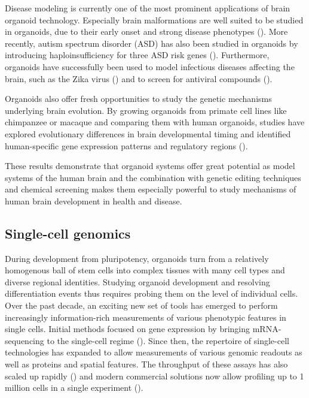 Disease modeling is currently one of the most prominent applications of brain organoid technology. Especially brain malformations are well suited to be studied in organoids, due to their early onset and strong disease phenotypes (\cite{klaus_altered_2019,lancaster_cerebral_2013}). More recently, autism spectrum disorder (ASD) has also been studied in organoids by introducing haploinsufficiency for three ASD risk genes (\cite{paulsen_autism_2022}). Furthermore, organoids have successfully been used to model infectious diseases affecting the brain, such as the Zika virus (\cite{qian_brain-region-specific_2016,dang_zika_2016}) and to screen for antiviral compounds (\cite{zhou_high-content_2017}). 

Organoids also offer fresh opportunities to study the genetic mechanisms underlying brain evolution. By growing organoids from primate cell lines like chimpanzee or macaque and comparing them with human organoids, studies have explored evolutionary differences in brain developmental timing and identified human-specific gene expression patterns and regulatory regions (\cite{kanton_organoid_2019,mora-bermudez_differences_2016,pollen_establishing_2019}).

These results demonstrate that organoid systems offer great potential as model systems of the human brain and the combination with genetic editing techniques and chemical screening makes them especially powerful to study mechanisms of human brain development in health and disease.

\clearpage


\subsection{Single-cell genomics}


During development from pluripotency, organoids turn from a relatively homogenous ball of stem cells into complex tissues with many cell types and diverse regional identities. Studying organoid development and resolving differentiation events thus requires probing them on the level of individual cells. Over the past decade, an exciting new set of tools has emerged to perform increasingly information-rich measurements of various phenotypic features in single cells. Initial methods focused on gene expression by bringing mRNA-sequencing to the single-cell regime (\cite{tang_mrna-seq_2009,islam_characterization_2011}). Since then, the repertoire of single-cell technologies has expanded to allow measurements of various genomic readouts as well as proteins and spatial features. The throughput of these assays has also scaled up rapidly (\cite{svensson_exponential_2018}) and modern commercial solutions now allow profiling up to 1 million cells in a single experiment (\cite{srivatsan_massively_2020,mulqueen_high-content_2021}). 

